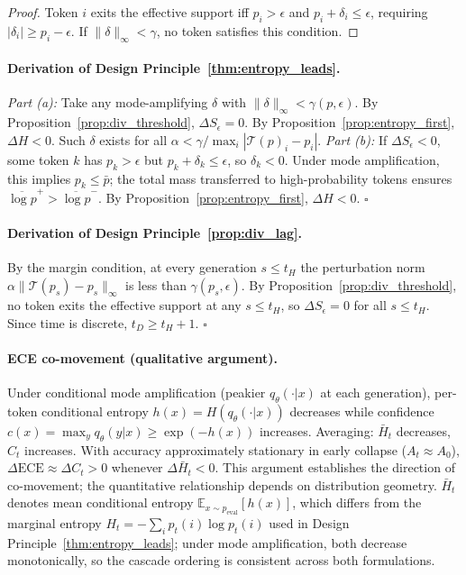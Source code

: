 \begin{proof}
Token $i$ exits the effective support iff $p_i > \epsilon$ and $p_i + \delta_i \leq \epsilon$, requiring $|\delta_i| \geq p_i - \epsilon$.
If $\|\delta\|_\infty < \gamma$, no token satisfies this condition.
\end{proof}

\paragraph{Derivation of Design Principle~\ref{thm:entropy_leads}.}
\emph{Part (a):} Take any mode-amplifying $\delta$ with $\|\delta\|_\infty < \gamma(p,\epsilon)$.
By Proposition~\ref{prop:div_threshold}, $\Delta S_\epsilon = 0$.
By Proposition~\ref{prop:entropy_first}, $\Delta H < 0$.
Such $\delta$ exists for all $\alpha < \gamma / \max_i |\mathcal{T}(p)_i - p_i|$.
\emph{Part (b):} If $\Delta S_\epsilon < 0$, some token $k$ has $p_k > \epsilon$ but $p_k + \delta_k \leq \epsilon$, so $\delta_k < 0$.
Under mode amplification, this implies $p_k \leq \bar{p}$; the total mass transferred to high-probability tokens ensures $\overline{\log p}^+ > \overline{\log p}^-$.
By Proposition~\ref{prop:entropy_first}, $\Delta H < 0$. $\square$

\paragraph{Derivation of Design Principle~\ref{prop:div_lag}.}
By the margin condition, at every generation $s \leq t_H$ the perturbation norm $\alpha\|\mathcal{T}(p_s) - p_s\|_\infty$ is less than $\gamma(p_s, \epsilon)$.
By Proposition~\ref{prop:div_threshold}, no token exits the effective support at any $s \leq t_H$, so $\Delta S_\epsilon = 0$ for all $s \leq t_H$.
Since time is discrete, $t_D \geq t_H + 1$. $\square$

\paragraph{ECE co-movement (qualitative argument).}
Under conditional mode amplification (peakier $q_\theta(\cdot|x)$ at each generation), per-token conditional entropy $h(x) = H(q_\theta(\cdot|x))$ decreases while confidence $c(x) = \max_y q_\theta(y|x) \geq \exp(-h(x))$ increases.
Averaging: $\bar{H}_t$ decreases, $C_t$ increases.
With accuracy approximately stationary in early collapse ($A_t \approx A_0$), $\Delta\mathrm{ECE} \approx \Delta C_t > 0$ whenever $\Delta\bar{H}_t < 0$.
This argument establishes the direction of co-movement; the quantitative relationship depends on distribution geometry.
$\bar{H}_t$ denotes mean conditional entropy $\mathbb{E}_{x \sim p_{\text{eval}}}[h(x)]$, which differs from the marginal entropy $H_t = -\sum_i p_t(i)\log p_t(i)$ used in Design Principle~\ref{thm:entropy_leads}; under mode amplification, both decrease monotonically, so the cascade ordering is consistent across both formulations.


